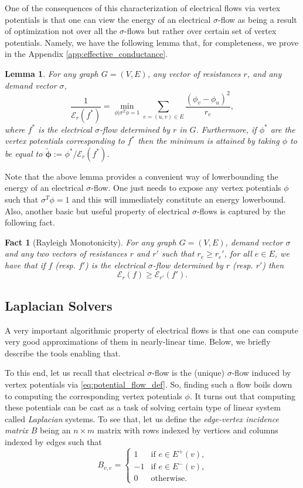 \documentclass[11pt, letterpaper]{article}
\newtheorem{lemma}[theorem]{Lemma}
\newtheorem{fact}[theorem]{Fact}
\newcommand{\energy}[2]{\mathcal{E}_{#1}(#2)}
\newcommand{\vphi}{\boldsymbol{\mathit{\phi}}}
\newcommand{\vsigma}{\boldsymbol{\mathit{\sigma}}}
\newcommand{\tvphi}{\boldsymbol{\tilde{\phi}}}
\newcommand{\ff}{\boldsymbol{\mathit{f}}}
\newcommand{\rr}{\boldsymbol{\mathit{r}}}
\newcommand{\BB}{\boldsymbol{\mathit{B}}}
\begin{document}
One of the consequences of this characterization of electrical flows via vertex potentials is that one can view the energy of an electrical $\vsigma$-flow as being a result of optimization not over all the $\vsigma$-flows but rather over certain set of vertex potentials. Namely, we have the following lemma that, for completeness, we prove in the Appendix \ref{app:effective_conductance}. 

\begin{lemma}\label{lem:effective_conductance}
For any graph $G=(V,E)$, any vector of resistances $\rr$, and any demand vector $\vsigma$, 
\[
\frac{1}{\energy{\rr}{\ff^*}} = \min_{\vphi| \vsigma^T \vphi=1} \sum_{e=(u,v)\in E} \frac{(\phi_v-\phi_u)^2}{r_{e}},
\]
where $\ff^*$ is the electrical $\vsigma$-flow determined by $\rr$ in $G$. Furthermore, if $\vphi^*$ are the vertex potentials corresponding to $\ff^*$ then the minimum is attained by taking $\vphi$ to be equal to $\tvphi:=\vphi^*/\energy{\rr}{\ff^*}$.
\end{lemma}

Note that the above lemma provides a convenient way of lowerbounding the energy of an electrical $\vsigma$-flow. One just needs to expose any vertex potentials $\vphi$ such that $\vsigma^T \vphi=1$ and this will immediately constitute an energy lowerbound. 
Also, another basic but useful property of electrical $\vsigma$-flows is captured by the following fact.

\begin{fact}[Rayleigh Monotonicity]
\label{fa:rayleigh_monotonicity}
For any graph $G=(V,E)$, demand vector $\vsigma$ and any two vectors of resistances $\rr$ and $\rr'$ such that $r_e\geq r_e'$, for all $e\in E$, we have that if $\ff$ (resp. $\ff'$) is the electrical $\vsigma$-flow determined by $\rr$ (resp. $\rr'$) then
\[
\energy{\rr}{\ff}\geq \energy{\rr'}{\ff'}.
\]
\end{fact}



\subsection{Laplacian Solvers}

A very important algorithmic property of electrical flows is that one can compute very good approximations of them in nearly-linear time. Below, we briefly describe the tools enabling that.

To this end, let us recall that electrical $\vsigma$-flow is the (unique) $\vsigma$-flow induced by vertex potentials via \eqref{eq:potential_flow_def}. So, finding such a flow boils down to computing the corresponding vertex potentials $\vphi$. It turns out that computing these potentials can be cast as a task of solving certain type of linear system called {\em Laplacian} systems. To see that, let us define the \emph{edge-vertex incidence matrix} $\BB$ being an $n\times m$ matrix with rows indexed by vertices
  and columns indexed by edges such that
\[
  \BB_{v,e} = \begin{cases}
1  & \text{if $e\in E^+(v)$,}\\
-1  & \text{if $e\in E^{-}(v)$,}\\
0 & \text{otherwise.}
\end{cases}
\]
\end{document}
